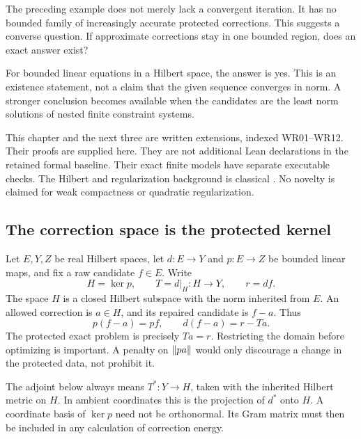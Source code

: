 \clearpage
{}\label{sec:bounded-realization}
The preceding example does not merely lack a convergent iteration. It has no bounded family of increasingly accurate protected corrections. This suggests a converse question. If approximate corrections stay in one bounded region, does an exact answer exist?

For bounded linear equations in a Hilbert space, the answer is yes. This is an existence statement, not a claim that the given sequence converges in norm. A stronger conclusion becomes available when the candidates are the least norm solutions of nested finite constraint systems.

\begin{scopebox}
This chapter and the next three are written extensions, indexed WR01--WR12. Their proofs are supplied here. They are not additional Lean declarations in the retained formal baseline. Their exact finite models have separate executable checks. The Hilbert and regularization background is classical \cite{clason-inverse}. No novelty is claimed for weak compactness or quadratic regularization.
\end{scopebox}

\subsection{The correction space is the protected kernel}
Let $E,Y,Z$ be real Hilbert spaces, let $d:E\to Y$ and $p:E\to Z$ be bounded linear maps, and fix a raw candidate $f\in E$. Write
\[
 H=\ker p,\qquad T=d|_H:H\to Y,\qquad r=df.
\]
The space $H$ is a closed Hilbert subspace with the norm inherited from $E$. An allowed correction is $a\in H$, and its repaired candidate is $f-a$. Thus
\[
 p(f-a)=pf,\qquad d(f-a)=r-Ta.
\]
The protected exact problem is precisely $Ta=r$. Restricting the domain before optimizing is important. A penalty on $\left\lVert pa\right\rVert$ would only discourage a change in the protected data, not prohibit it.

The adjoint below always means $T^*:Y\to H$, taken with the inherited Hilbert metric on $H$. In ambient coordinates this is the projection of $d^*$ onto $H$. A coordinate basis of $\ker p$ need not be orthonormal. Its Gram matrix must then be included in any calculation of correction energy.

